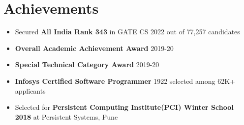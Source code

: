\documentclass[10.8pt, a4paper]{extarticle}
\newcommand{\shorterSection}[1]{\vspace{-10pt}\section{#1}}
\begin{document}
\shorterSection{Achievements}
\begin{itemize}
  \item Secured \textbf{All India Rank 343} in GATE CS 2022 out of 77,257 candidates\\[-0.6cm]
  \item \textbf{Overall Academic Achievement Award} 2019-20\\[-0.6cm]
  \item \textbf{Special Technical Category Award} 2019-20\\[-0.6cm]
  \item \textbf{Infosys Certified Software Programmer} 1922 selected among 62K+ applicants\\[-0.6cm]
  \item Selected for \textbf{Persistent Computing Institute(PCI) Winter School 2018} at Persistent Systems, Pune\\[-0.6cm]
\end{itemize}
\end{document}
